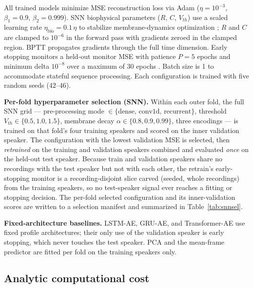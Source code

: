 \documentclass[conference]{IEEEtran}
\begin{document}
\par All trained models minimize MSE reconstruction loss via Adam
\cite{kingma2015adam} ($\eta = 10^{-3}$, $\beta_1=0.9$, $\beta_2=0.999$).
SNN biophysical parameters ($R$, $C$, $V_{th}$) use a scaled learning rate
$\eta_{\mathrm{bio}} = 0.1\,\eta$ to stabilize membrane-dynamics optimization
\cite{neftci2019surrogate}; $R$ and $C$ are clamped to $10^{-6}$ in the
forward pass with gradients zeroed in the clamped region.
BPTT \cite{werbos1990backpropagation} propagates gradients through the full
time dimension. Early stopping monitors a held-out monitor MSE with patience
$P=5$ epochs and minimum delta $10^{-8}$ over a maximum of 30 epochs
\cite{eshraghian2023training}. Batch size is 1 to accommodate stateful
sequence processing. Each configuration is trained with five random seeds
($42$--$46$).

\par \textbf{Per-fold hyperparameter selection (SNN).} Within each outer fold,
the full SNN grid --- pre-processing mode
$\in\{\text{dense, conv1d, recurrent}\}$, threshold
$V_{th}\in\{0.5,1.0,1.5\}$, membrane decay $\alpha\in\{0.8,0.9,0.99\}$, three
encodings --- is trained on that fold's four training speakers and scored on the
inner validation speaker. The configuration with the lowest validation MSE is
selected, then \emph{retrained} on the training and validation speakers combined
and evaluated \emph{once} on the held-out test speaker. Because train and
validation speakers share no recordings with the test speaker but not with each
other, the retrain's early-stopping monitor is a recording-disjoint slice carved
(seeded, whole recordings) from the training speakers, so no test-speaker signal
ever reaches a fitting or stopping decision. The per-fold selected configuration
and its inner-validation scores are written to a selection manifest and
summarized in Table~\ref{tab:snnsel}.

\par \textbf{Fixed-architecture baselines.} LSTM-AE, GRU-AE, and Transformer-AE
use fixed profile architectures; their only use of the validation speaker is
early stopping, which never touches the test speaker. PCA and the mean-frame
predictor are fitted per fold on the training speakers only.

\subsection{Analytic computational cost}
\label{sec:energy}
\end{document}
